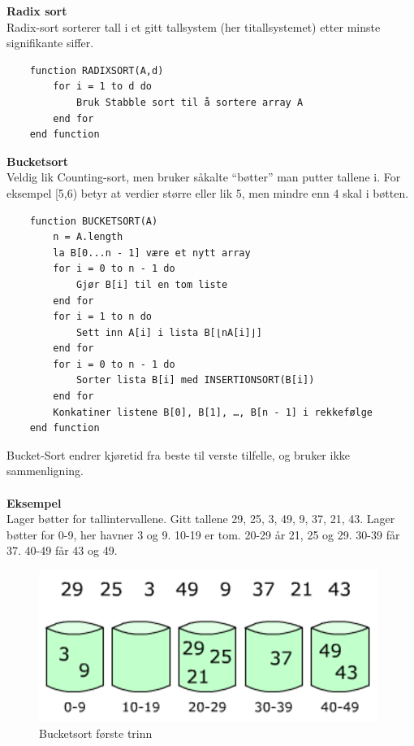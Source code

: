 \noindent \textbf{Radix sort}\\
Radix-sort sorterer tall i et gitt tallsystem (her titallsystemet) etter minste signifikante siffer.

\begin{lstlisting}
    function RADIXSORT(A,d)
    	for i = 1 to d do
    		Bruk Stabble sort til å sortere array A
    	end for
    end function
\end{lstlisting}

\noindent \textbf{Bucketsort}\\
Veldig lik Counting-sort, men bruker såkalte “bøtter” man putter tallene i. For eksempel [5,6) betyr at verdier større eller lik 5, men mindre enn 4 skal i bøtten.

\begin{lstlisting}
    function BUCKETSORT(A)
	    n = A.length
	    la B[0...n - 1] være et nytt array
	    for i = 0 to n - 1 do
	    	Gjør B[i] til en tom liste
	    end for
	    for i = 1 to n do
    		Sett inn A[i] i lista B[⌊nA[i]⌋]
    	end for
	    for i = 0 to n - 1 do
		    Sorter lista B[i] med INSERTIONSORT(B[i])
	    end for
	    Konkatiner listene B[0], B[1], …, B[n - 1] i rekkefølge
    end function
\end{lstlisting}

\noindent Bucket-Sort endrer kjøretid fra beste til verste tilfelle, og bruker ikke sammenligning.
\\\\
\noindent \textbf{Eksempel}\\
Lager bøtter for tallintervallene. Gitt tallene 29, 25, 3, 49, 9, 37, 21, 43. Lager bøtter for 0-9, her havner 3 og 9. 10-19 er tom. 20-29 år 21, 25 og 29. 30-39 får 37. 40-49 får 43 og 49.

\begin{figure}[H]
\includegraphics[scale=0.5]{images/bucketsort1}
\centering %
\caption{Bucketsort første trinn}
\label{fig:bucketsort1}
\end{figure}


